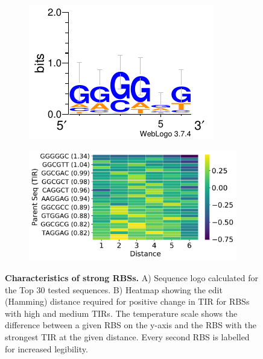 \documentclass{article}
\begin{document}
\begin{figure}[!t]
     \centering
     \begin{subfigure}[b]{0.49\textwidth}
         \centering
         \caption{}
         \includegraphics[scale=1.2]{plots/Main_Paper/TOP30_logo.pdf}
     \end{subfigure}
     \hfill
     \begin{subfigure}[b]{0.49\textwidth}
         \centering
         \caption{}
         \includegraphics[scale=0.43]{plots/Main_Paper/heatmap.pdf}
     \end{subfigure}
     \caption{\textbf{Characteristics of strong RBSs.} A) Sequence logo calculated for the Top 30 tested sequences. B) Heatmap showing the edit (Hamming) distance required for positive change in TIR for RBSs with high and medium TIRs. The temperature scale shows the difference between a given RBS on the y-axis and the RBS with the strongest TIR at the given distance. Every second RBS is labelled for increased legibility.}
     \label{fig:Library characteristics}
\end{figure}
\end{document}
